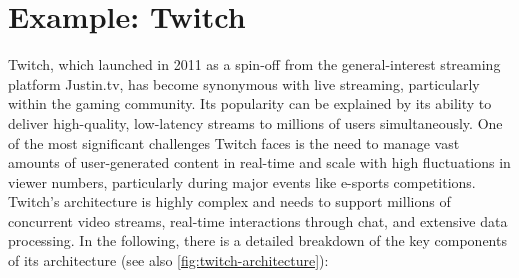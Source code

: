 


\section{Example: Twitch}
Twitch, which launched in 2011 as a spin-off from the general-interest streaming platform Justin.tv, has become synonymous with live streaming, particularly within the gaming community. Its popularity can be explained by its ability to deliver high-quality, low-latency streams to millions of users simultaneously. 
One of the most significant challenges Twitch faces is the need to manage vast amounts of user-generated content in real-time and scale with high fluctuations in viewer numbers, particularly during major events like e-sports competitions.
Twitch's architecture is highly complex and needs to support millions of concurrent video streams, real-time interactions through chat, and extensive data processing. In the following, there is a detailed breakdown of the key components of its architecture (see also \autoref{fig:twitch-architecture}):

